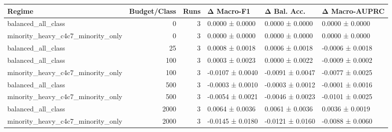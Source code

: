 \begin{tabular}{lrrlll}
\toprule
Regime & Budget/Class & Runs & Δ Macro-F1 & Δ Bal. Acc. & Δ Macro-AUPRC \\
\midrule
balanced_all_class & 0 & 3 & 0.0000 ± 0.0000 & 0.0000 ± 0.0000 & 0.0000 ± 0.0000 \\
minority_heavy_c4c7_minority_only & 0 & 3 & 0.0000 ± 0.0000 & 0.0000 ± 0.0000 & 0.0000 ± 0.0000 \\
balanced_all_class & 25 & 3 & 0.0008 ± 0.0018 & 0.0006 ± 0.0018 & -0.0006 ± 0.0018 \\
balanced_all_class & 100 & 3 & 0.0003 ± 0.0023 & 0.0000 ± 0.0022 & -0.0009 ± 0.0002 \\
minority_heavy_c4c7_minority_only & 100 & 3 & -0.0107 ± 0.0040 & -0.0091 ± 0.0047 & -0.0077 ± 0.0025 \\
balanced_all_class & 500 & 3 & -0.0003 ± 0.0010 & -0.0003 ± 0.0012 & -0.0001 ± 0.0016 \\
minority_heavy_c4c7_minority_only & 500 & 3 & -0.0054 ± 0.0021 & -0.0046 ± 0.0023 & -0.0101 ± 0.0025 \\
balanced_all_class & 2000 & 3 & 0.0064 ± 0.0036 & 0.0061 ± 0.0036 & 0.0036 ± 0.0019 \\
minority_heavy_c4c7_minority_only & 2000 & 3 & -0.0145 ± 0.0180 & -0.0121 ± 0.0160 & -0.0088 ± 0.0060 \\
\bottomrule
\end{tabular}
